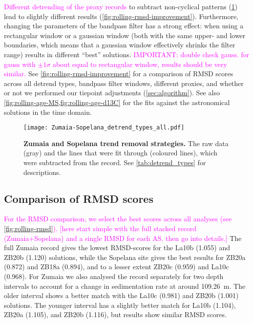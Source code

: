 \documentclass[draft]{agujournal2019}
\newcommand{\rez}{\textcolor{magenta}}
\begin{document}
\rez{Different detrending of the proxy records} to subtract non-cyclical patterns (\cref{fig:detrend}) lead to slightly different results (\cref{fig:rolling-rmsd-improvement}).
Furthermore, changing the parameters of the bandpass filter has a strong effect: when using a rectangular window or a gaussian window (both with the same upper- and lower boundaries, which means that a gaussian window effectively shrinks the filter range) results in different ``best'' solutions. \rez{IMPORTANT: double check gauss. for gauss with $\pm 1 \sigma$ about equal to rectangular window, results should be very similar.}
See \cref{fig:rolling-rmsd-improvement} for a comparison of \gls{RMSD} scores across all detrend types, bandpass filter windows, different proxies, and whether or not we performed our tiepoint adjustments (\cref{sec:algorithm}).
See also \cref{fig:rolling-age-MS,fig:rolling-age-d13C} for the fits against the astronomical solutions in the time domain.

\begin{figure}[htbp]
  \centering
  \texttt{[image: Zumaia-Sopelana\_detrend\_types\_all.pdf]}
  \caption{\label{fig:detrend}
    \textbf{Zumaia and Sopelana trend removal strategies.}
    The raw data (gray) and the lines that were fit through (coloured lines), which were subtracted from the record. See \cref{tab:detrend_types} for descriptions.
    }
\end{figure}

\subsection{Comparison of RMSD scores}

\rez{For the RMSD comparison, we select the best scores across all analyses (see \cref{fig:rolling-rmsd}).} \rez{[here start simple with the full stacked
record (Zumaia+Sopelana) and a single RMSD for each AS. then go into details.]}
The full Zumaia record gives the lowest \gls{RMSD}-scores for the La10b (\num{1.055}) and ZB20b (\num{1.120}) solutions,
while the Sopelana site gives the best results for ZB20a (\num{0.872}) and ZB18a (\num{0.894}), and to a lesser extent ZB20c (\num{0.959}) and La10c (\num{0.968}).
For Zumaia we also analysed the record separately for two depth intervals to account for a change in sedimentation rate at around \qty{109.26}{\metre}.
The older interval shows a better match with the La10c (\num{0.981}) and ZB20b (1.001) solutions.
The younger interval has a slightly better match for La10b (\num{1.104}), ZB20a (\num{1.105}), and ZB20b (\num{1.116}), but results show similar \gls{RMSD} scores.
\end{document}
